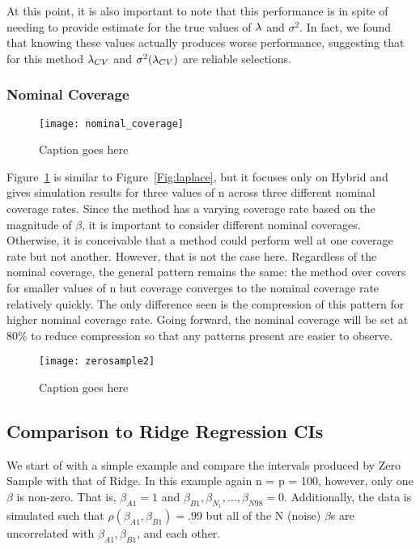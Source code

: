 At this point, it is also important to note that this performance is in spite of needing to provide estimate for the true values of $\lambda$ and $\sigma^2$. In fact, we found that knowing these values actually produces worse performance, suggesting that for this method $\lambda_{CV}$ and $\sigma^2(\lambda_{CV})$ are reliable selections.

\subsubsection{Nominal Coverage}

\begin{figure}[hbtp]
  \texttt{[image: nominal\_coverage]}
  \caption{\label{Fig:nominal_coverage} Caption goes here}
\end{figure} 

Figure~\ref{Fig:nominal_coverage} is similar to Figure~\ref{Fig:laplace}, but it focuses only on Hybrid and gives simulation results for three values of n across three different nominal coverage rates. Since the method has a varying coverage rate based on the magnitude of $\beta$, it is important to consider different nominal coverages. Otherwise, it is conceivable that a method could perform well at one coverage rate but not another. However, that is not the case here. Regardless of the nominal coverage, the general pattern remains the same: the method over covers for smaller values of n but coverage converges to the nominal coverage rate relatively quickly. The only difference seen is the compression of this pattern for higher nominal coverage rate. Going forward, the nominal coverage will be set at $80\%$ to reduce compression so that any patterns present are easier to observe.

\begin{figure}[hbtp]
  \texttt{[image: zerosample2]}
  \caption{\label{Fig:zerosample2} Caption goes here}
\end{figure}

\subsection{Comparison to Ridge Regression CIs}

We start of with a simple example and compare the intervals produced by Zero Sample with that of Ridge. In this example again n = p = 100, however, only one $\beta$ is non-zero. That is, $\beta_{A1} = 1$ and $\beta_{B1}, \beta_{N_1}, \ldots, \beta_{N98} = 0$. Additionally, the data is simulated such that $\rho(\beta_{A1}, \beta_{B1}) = .99$ but all of the N (noise) $\beta$s are uncorrelated with $\beta_{A1}, \beta_{B1}$, and each other.

